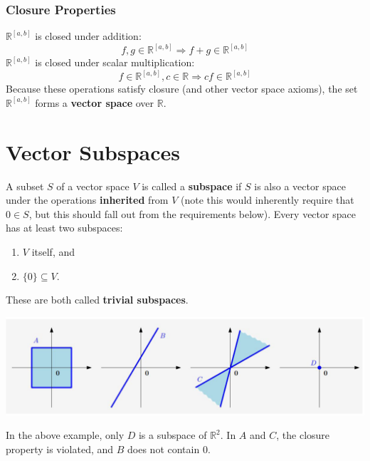 \documentclass[10pt]{article}
\begin{document}
\subsubsection*{Closure Properties}
$\mathbb{R}^{[a, b]}$ is closed under addition:
\[f, g \in \mathbb{R}^{[a, b]} \Rightarrow f + g \in \mathbb{R}^{[a, b]}\]
$\mathbb{R}^{[a, b]}$ is closed under scalar multiplication:
\[f \in \mathbb{R}^{[a, b]}, c \in \mathbb{R} \Rightarrow cf \in \mathbb{R}^{[a, b]}\]
Because these operations satisfy closure (and other vector space axioms), the set $\mathbb{R}^{[a, b]}$ forms a \textbf{vector space} over $\mathbb{R}$.

\section*{Vector Subspaces}
A subset $S$ of a vector space $V$ is called a \textbf{subspace} if $S$ is also a vector space under the operations \textbf{inherited} from $V$ (note this would inherently require that $0 \in S$, but this should fall out from the requirements below).  Every vector space has at least two subspaces:
\begin{enumerate}
	\item $V$ itself, and
	\item $\{0\} \subseteq V$.
\end{enumerate}
These are both called \textbf{trivial subspaces}.
\begin{center} 
	\includegraphics*[width=\textwidth]{M8_6.png} 
\end{center}
In the above example, only $D$ is a subspace of $\mathbb{R}^2$.  In $A$ and $C$, the closure property is violated, and $B$ does not contain 0.
\end{document}
